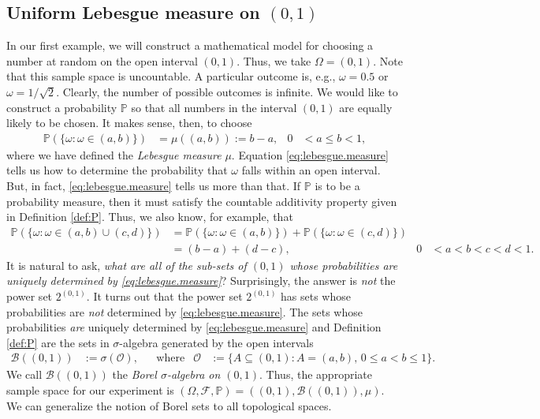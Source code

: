 \documentclass[12pt]{book}
\numberwithin{equation}{chapter}
\theoremstyle{plain}
\numberwithin{theorem}{section}
\theoremstyle{definition}
\newtheorem{example}[theorem]{\underline{Example}}
\numberwithin{exercise}{chapter}
\newcommand{\<}{\langle}
\renewcommand{\>}{\rangle}
\renewcommand{\(}{\left(}
\renewcommand{\)}{\right)}
\renewcommand{\[}{\left[}
\renewcommand{\]}{\right]}
\newcommand\Pb{\mathds{P}}
\newcommand\Bc{\mathscr{B}}
\newcommand\Fc{\mathscr{F}}
\newcommand\Oc{\mathscr{O}}
\newcommand\om{\omega}
\newcommand\Om{\Omega}
\newcommand\sig{\sigma}
\begin{document}
\subsection{Uniform Lebesgue measure on $(0,1)$}
\label{sec:lebesgue.measure}
In our first example, we will construct a mathematical model for choosing a number at random on the open interval $(0,1)$.
Thus, we take $\Om = (0,1)$.  
Note that this sample space is uncountable.
A particular outcome is, e.g., $\om = 0.5$ or $\om = 1/\sqrt{2}$.
Clearly, the number of possible outcomes is infinite.
We would like to construct a probability $\Pb$ so that all numbers in the interval $(0,1)$ are equally likely to be chosen.
It makes sense, then, to choose
\begin{align}
\Pb( \{ \om : \om \in (a,b) \} )
	&=	\mu( (a,b) )
	:=	b	-a , &
0
	&< a \leq b < 1 , \label{eq:lebesgue.measure}
\end{align}
where we have defined the \emph{Lebesgue measure} $\mu$.  Equation \eqref{eq:lebesgue.measure} tells us how to determine the probability that $\om$ falls within an open interval.  But, in fact, \eqref{eq:lebesgue.measure} tells us more than that.  If $\Pb$ is to be a probability measure, then it must satisfy the countable additivity property given in Definition \ref{def:P}.  Thus, we also know, for example, that
\begin{align}
\Pb( \{ \om : \om \in (a,b) \cup (c,d) \} )
	&=	\Pb( \{ \om : \om \in (a,b) \} ) + \Pb( \{ \om : \om \in  (c,d) \} ) \\
	&=		(b-a) + (d-c) , &
0
	&< a < b < c < d < 1 .
\end{align}
It is natural to ask, \emph{what are all of the sub-sets of $(0,1)$ whose probabilities are uniquely determined by \eqref{eq:lebesgue.measure}}?
Surprisingly, the answer is \emph{not} the power set $2^{(0,1)}$.  It turns out that the power set $2^{(0,1)}$ has sets whose probabilities are \emph{not} determined by \eqref{eq:lebesgue.measure}.  The sets whose probabilities \emph{are} uniquely determined by \eqref{eq:lebesgue.measure} and Definition \ref{def:P} are the sets in $\sig$-algebra generated by the open intervals
\begin{align}
\Bc((0,1))
	&:=	\sig( \Oc ) , &
	&\text{where} &
\Oc
	&:=	\{ A \subseteq (0,1) : A = (a,b) , \,  0 \leq a < b \leq 1 \} .
\end{align}
We call $\Bc((0,1))$ the \emph{Borel $\sig$-algebra on $(0,1)$}.  Thus, the appropriate sample space for our experiment is $(\Om,\Fc,\Pb) = ((0,1),\Bc((0,1)),\mu)$.
\\[0.5em]
We can generalize the notion of Borel sets to all topological spaces.
\end{document}
